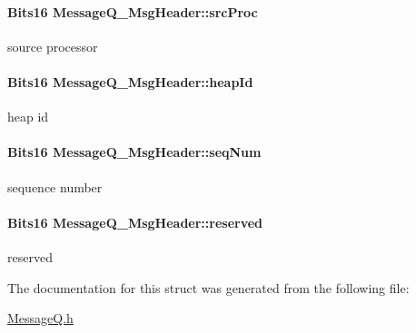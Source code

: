 \paragraph[{src\-Proc}]{\setlength{\rightskip}{0pt plus 5cm}Bits16 Message\-Q\-\_\-\-Msg\-Header\-::src\-Proc}\label{struct_message_q___msg_header_a29c80efb7f32089965ce1a0e69b7262c}
source processor 
\paragraph[{heap\-Id}]{\setlength{\rightskip}{0pt plus 5cm}Bits16 Message\-Q\-\_\-\-Msg\-Header\-::heap\-Id}\label{struct_message_q___msg_header_a4281bf0f37f64a9c5e580f0abc3536eb}
heap id 
\paragraph[{seq\-Num}]{\setlength{\rightskip}{0pt plus 5cm}Bits16 Message\-Q\-\_\-\-Msg\-Header\-::seq\-Num}\label{struct_message_q___msg_header_afcef65b2eebc0e508363870743706909}
sequence number 
\paragraph[{reserved}]{\setlength{\rightskip}{0pt plus 5cm}Bits16 Message\-Q\-\_\-\-Msg\-Header\-::reserved}\label{struct_message_q___msg_header_a66d4a1e8d4a20da8bad4feca1c710e53}
reserved 

The documentation for this struct was generated from the following file\-:\begin{DoxyCompactItemize}
\item 
\hyperlink{_message_q_8h}{Message\-Q.\-h}\end{DoxyCompactItemize}

